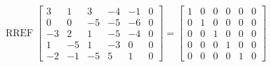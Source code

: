 \begin{exerciseAnswer} 


\[\operatorname{RREF} \left[\begin{array}{ccccc|c}
3 & 1 & 3 & -4 & -1 & 0 \\
0 & 0 & -5 & -5 & -6 & 0 \\
-3 & 2 & 1 & -5 & -4 & 0 \\
1 & -5 & 1 & -3 & 0 & 0 \\
-2 & -1 & -5 & 5 & 1 & 0
\end{array}\right] = \left[\begin{array}{ccccc|c}
1 & 0 & 0 & 0 & 0 & 0 \\
0 & 1 & 0 & 0 & 0 & 0 \\
0 & 0 & 1 & 0 & 0 & 0 \\
0 & 0 & 0 & 1 & 0 & 0 \\
0 & 0 & 0 & 0 & 1 & 0
\end{array}\right] \]



\end{exerciseAnswer}
